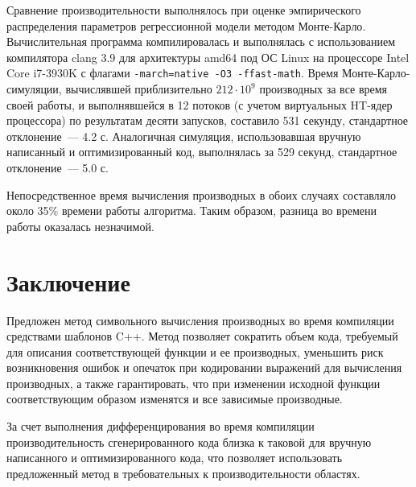 \documentclass[11pt,a4paper]{article}
\begin{document}
Сравнение производительности выполнялось при оценке эмпирического распределения
параметров регрессионной модели методом Монте-Карло\cite{Rudoy15MonteCarlo}.
Вычислительная программа компилировалась и выполнялась с использованием компилятора
clang 3.9 для архитектуры amd64 под ОС Linux на процессоре Intel Core i7-3930K
с флагами \texttt{-march=native -O3 -ffast-math}. Время Монте-Карло-симуляции,
вычислявшей приблизительно $212 \cdot 10^9$ производных за все время своей работы,
и выполнявшейся в 12 потоков (с учетом виртуальных HT-ядер процессора) по результатам
десяти запусков, составило 531 секунду, стандартное отклонение~--- 4.2 с.
Аналогичная симуляция, использовавшая вручную написанный и оптимизированный код,
выполнялась за 529 секунд, стандартное отклонение~--- 5.0 с.

Непосредственное время вычисления производных в обоих случаях составляло около
35\% времени работы алгоритма. Таким образом, разница во времени работы оказалась
незначимой.

\section{Заключение}

Предложен метод символьного вычисления производных во время компиляции средствами
шаблонов C++. Метод позволяет сократить объем кода, требуемый для описания
соответствующей функции и ее производных, уменьшить риск возникновения ошибок и
опечаток при кодировании выражений для вычисления производных, а также гарантировать,
что при изменении исходной функции соответствующим образом изменятся и все зависимые
производные.

За счет выполнения дифференцирования во время компиляции производительность
сгенерированного кода близка к таковой для вручную написанного и оптимизированного
кода, что позволяет использовать предложенный метод в требовательных к производительности
областях.


%
%

\end{document}

